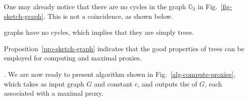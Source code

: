 One may already notice that there are no cycles in the \bcsketch graph $\mathbb{G}_3$ in Fig.~\ref{fig-sketch-graph}. This is not a coincidence, as shown below.

\begin{prop}
\label{pro-sketch-graph} \bcsketch graphs have no cycles, which implies that they are simply trees.
\end{prop}



Proposition~\ref{pro-sketch-graph} indicates that the good properties of trees can be employed for computing \dras and maximal proxies.


.
We are now ready to present algorithm \compDRAs shown in Fig.~\ref{alg-compute-proxies}, which takes as input graph $G$ and constant $c$, and outputs the \dras of $G$, each associated with a maximal proxy.

